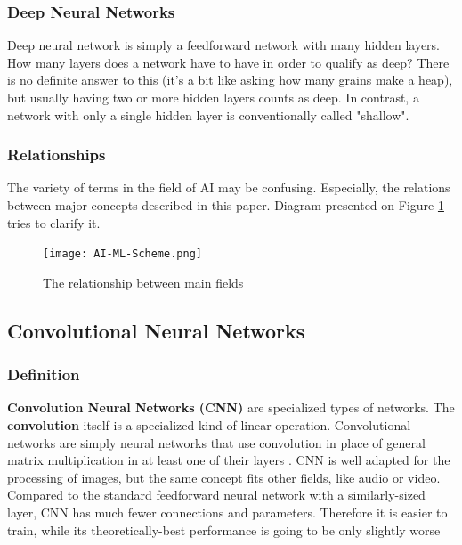 \documentclass[../Main.tex]{subfiles}
\begin{document}
    \subsubsection{Deep Neural Networks}
    Deep neural network is simply a feedforward network with many hidden layers. 
    How many layers does a network have to have in order to qualify as deep? There is no definite answer to this (it's a bit like asking how many grains make a heap), but usually having two or more hidden layers counts as deep. In contrast, a network with only a single hidden layer is conventionally called "shallow". 
    
\newpage

    \subsubsection{Relationships}
    The variety of terms in the field of AI may be confusing. Especially, the relations between major concepts described in this paper. Diagram presented on Figure \ref{fig:AI-ML-Scheme} tries to clarify it.
    \\
    \begin{figure}[h!]
        \centering
        \texttt{[image: AI-ML-Scheme.png]}
        \caption{The relationship between main fields}
        \label{fig:AI-ML-Scheme}
    \end{figure}

\subsection{Convolutional Neural Networks}

    \subsubsection{Definition}
    \textbf{Convolution Neural Networks (CNN)} are specialized types of networks. The \textbf{convolution} itself is a specialized kind of linear operation. Convolutional networks are simply neural networks that use convolution in place of general matrix multiplication in at least one of their layers \cite{Goodfellow-et-al-2016}.  CNN is well adapted for the processing of images, but the same concept fits other fields, like audio or video. 
    Compared to the standard feedforward neural network with a similarly-sized layer, CNN has much fewer connections and parameters. Therefore it is easier to train, while its theoretically-best performance is going to be only slightly worse 
        
\end{document}
